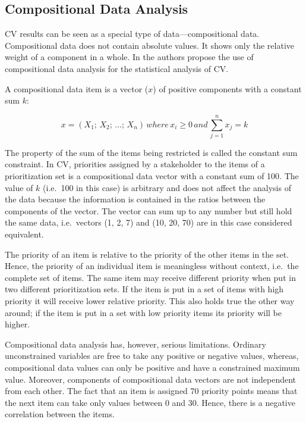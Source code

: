 
\subsection{\label{coda}Compositional Data Analysis}

CV results can be seen as a special type of data---compositional data.
Compositional data does not contain absolute values. It shows only
the relative weight of a component in a whole. In \citep{Chatzipetrou2010} the authors
propose the use of compositional data analysis for the statistical analysis of CV. 

A compositional data item is a vector
($x$) of positive components with a constant sum $k$:

\begin{equation}
x=(X_{1};\, X_{2};\,...;\, X_{n})\, where\, x_{i}\geq0\, and\,\sum_{j=1}^{n}x_{j}=k
\label{eq:compositional-data}
\end{equation}

The property of the sum of the items being restricted is called the constant
sum constraint. In CV, priorities assigned by a stakeholder to the items of a prioritization
set is a compositional data vector with a constant sum of 100.
The value of $k$ (i.e.\ 100 in this case) is arbitrary and does not affect the analysis of the data because the
information is contained in the ratios between the components of the vector.
The vector can sum up to any number but still hold the same data, i.e.\ vectors (1, 2, 7) and (10, 20, 70) are in this case considered equivalent.

The priority of an item is relative to the priority of the other items
in the set. Hence, the priority of an individual item is meaningless without
context, i.e.\ the complete set of items. The same item may receive different priority
when put in two different prioritization sets. If the item is put
in a set of items with high priority it will receive lower relative
priority. This also holds true the other way around; if the item is put in a set
with low priority items its priority will be higher.

Compositional data analysis has, however, serious limitations.
Ordinary unconstrained variables are free to take any positive or negative
values, whereas, compositional data values can only be positive and
have a constrained maximum value. Moreover, components of compositional
data vectors are not independent from each other. The fact that an
item is assigned 70 priority points means that the next item can take
only values between 0 and 30. Hence, there is a negative correlation
between the items.

